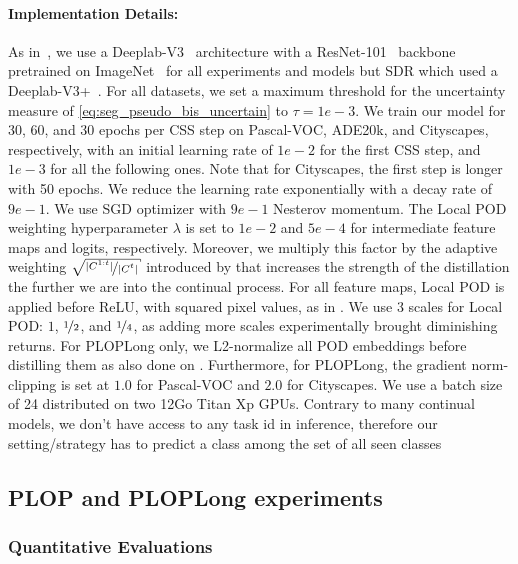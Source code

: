 \paragraph{Implementation Details:\,}As in~\cite{cermelli2020modelingthebackground}, we use a
Deeplab-V3~\cite{chen2017deeplabv3} architecture with a ResNet-101~\cite{he2016resnet} backbone
pretrained on ImageNet~\cite{deng2009imagenet} for all experiments and models but SDR
\cite{michieli2021sdr} which used a Deeplab-V3+~\cite{chen2018deeplabv3plus}. For all datasets, we
set a maximum threshold for the uncertainty measure of \autoref{eq:seg_pseudo_bis_uncertain} to
$\tau=1e-3$. We train our model for 30, 60, and 30 epochs per \ac{CSS} step on Pascal-VOC, ADE20k, and
Cityscapes, respectively, with an initial learning rate of $1e-2$ for the first \ac{CSS} step, and $1e-3$
for all the following ones. Note that for Cityscapes, the first step is longer with 50 epochs. We
reduce the learning rate exponentially with a decay rate of $9e-1$. We use SGD optimizer with $9e-1$
Nesterov momentum. The Local POD weighting hyperparameter $\lambda$ is set to $1e-2$ and $5e-4$ for
intermediate feature maps and logits, respectively. Moreover, we multiply this factor by the
adaptive weighting $\sqrt{\nicefrac{|C^{1:t}|}{|C^{t}|}}$ introduced by \cite{hou2019ucir} that
increases the strength of the distillation the further we are into the continual process. For all
feature maps, Local POD is applied before ReLU, with squared pixel values, as in
\cite{zagoruyko2016distillation_attention,douillard2020podnet}. We use 3 scales for Local POD: $1$,
$\nicefrac{1}{2}$, and $\nicefrac{1}{4}$, as adding more scales experimentally brought diminishing
returns. For PLOPLong only, we L2-normalize all POD embeddings before distilling them as also done
on \cite{douillard2020podnet}. Furthermore, for PLOPLong, the gradient norm-clipping is set at $1.0$
for Pascal-VOC and $2.0$ for Cityscapes. We use a batch size of 24 distributed on two 12Go Titan Xp
GPUs. Contrary to many continual models, we don't have access to any task id in inference, therefore
our setting/strategy has to predict a class among the set of all seen classes

\subsection{PLOP and PLOPLong experiments}
\label{sec:seg_plop_exp}

\subsubsection{Quantitative Evaluations}

